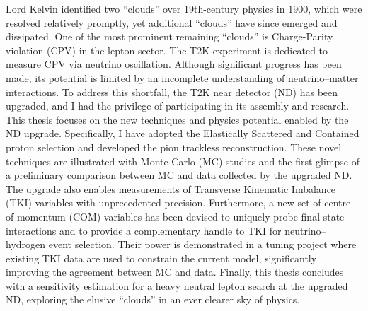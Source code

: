 Lord Kelvin identified two “clouds” over 19th-century physics in 1900, which were resolved relatively promptly, yet additional “clouds” have since emerged and dissipated.
One of the most prominent remaining ``clouds'' is Charge-Parity violation (CPV) in the lepton sector.
The T2K experiment is dedicated to measure CPV via neutrino oscillation.
Although significant progress has been made, its potential is limited by an incomplete understanding of neutrino–matter interactions.
To address this shortfall, the T2K near detector (ND) has been upgraded, and I had the privilege of participating in its assembly and research.
This thesis focuses on the new techniques and physics potential enabled by the ND upgrade.
Specifically, I have adopted the Elastically Scattered and Contained proton selection and developed the pion trackless reconstruction.
These novel techniques are illustrated with Monte Carlo (MC) studies and the first glimpse of a preliminary comparison between MC and data collected by the upgraded ND.
The upgrade also enables measurements of Transverse Kinematic Imbalance (TKI) variables with unprecedented precision. 
Furthermore, a new set of centre-of-momentum (COM) variables has been devised to uniquely probe final-state interactions and to provide a complementary handle to TKI for neutrino–hydrogen event selection.
Their power is demonstrated in a tuning project where existing TKI data are used to constrain the current model, significantly improving the agreement between MC and data.
Finally, this thesis concludes with a sensitivity estimation for a heavy neutral lepton search at the upgraded ND, exploring the elusive “clouds” in an ever clearer sky of physics.